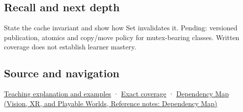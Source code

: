 \subsection{Recall and next depth}\label{appendix-f5593256bcaf-recall-and-next-depth}

State the cache invariant and show how Set invalidates it. Pending: versioned publication, atomics and copy/move policy for mutex-bearing classes. Written coverage does not establish learner mastery.

\subsection{Source and navigation}\label{appendix-f5593256bcaf-source-and-navigation}

\hyperref[01-foundations-i-ch003-a-cache-may-change-bits-without-changing-meaning]{Teaching explanation and examples} · \hyperref[appendix-fd090d982a15-m008---parts-113-126]{Exact coverage} · \href{../07-Vision-XR-and-Playable-Worlds/main.pdf\#nameddest=appendix-4ad47bdd269a}{Dependency Map (Vision, XR, and Playable Worlds, Reference notes: Dependency Map)}
